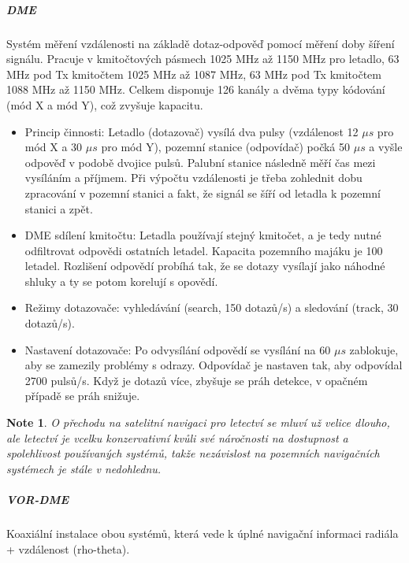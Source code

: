 \documentclass[11pt,a4paper]{article}
\theoremstyle{my-theorem}
\theoremstyle{non-theorem}
\newtheorem{note}[theorem]{Note}
\begin{document}
\subparagraph*{DME} Systém měření vzdálenosti na základě dotaz-odpověď pomocí měření doby šíření signálu. Pracuje v kmitočtových pásmech 1025 MHz až 1150 MHz pro letadlo, 63 MHz pod Tx kmitočtem 1025 MHz až 1087 MHz, 63 MHz pod Tx kmitočtem 1088 MHz až 1150 MHz. Celkem disponuje 126 kanály a dvěma typy kódování (mód X a mód Y), což zvyšuje kapacitu.
\begin{itemize}
    \item Princip činnosti: Letadlo (dotazovač) vysílá dva pulsy (vzdálenost 12 $\mu s$ pro mód X a 30 $\mu s$ pro mód Y), pozemní stanice (odpovídač) počká 50 $\mu s$ a vyšle odpověď v podobě dvojice pulsů. Palubní stanice následně měří čas mezi vysíláním a příjmem. Při výpočtu vzdálenosti je třeba zohlednit dobu zpracování v pozemní stanici a fakt, že signál se šíří od letadla k pozemní stanici a zpět.
    \item DME sdílení kmitočtu: Letadla používají stejný kmitočet, a je tedy nutné odfiltrovat odpovědi ostatních letadel. Kapacita pozemního majáku je 100 letadel. Rozlišení odpovědí probíhá tak, že se dotazy vysílají jako náhodné shluky a ty se potom korelují s opovědí.
    \item Režimy dotazovače: vyhledávání (search, 150 dotazů/s) a sledování (track, 30 dotazů/s).
    \item Nastavení dotazovače: Po odvysílání odpovědí se vysílání na 60 $\mu s$ zablokuje, aby se zamezily problémy s odrazy. Odpovídač je nastaven tak, aby odpovídal 2700 pulsů/s. Když je dotazů více, zbyšuje se práh detekce, v opačném případě se práh snižuje.
\end{itemize}
\begin{note}
    O přechodu na satelitní navigaci pro letectví se mluví už velice dlouho, ale letectví je vcelku konzervativní kvůli své náročnosti na dostupnost a spolehlivost používaných systémů, takže nezávislost na pozemních navigačních systémech je stále v nedohlednu.
\end{note}

\subparagraph*{VOR-DME} Koaxiální instalace obou systémů, která vede k úplné navigační informaci radiála + vzdálenost (rho-theta).
\end{document}

